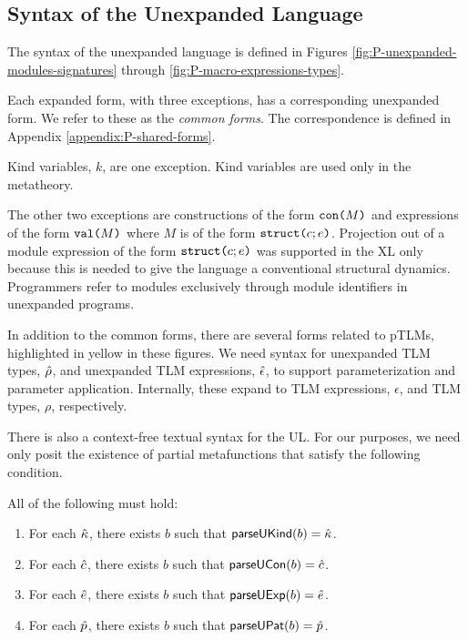 \subsection{Syntax of the Unexpanded Language}
The syntax of the unexpanded language is defined in Figures \ref{fig:P-unexpanded-modules-signatures} through \ref{fig:P-macro-expressions-types}.

Each expanded form, with three exceptions, has a corresponding unexpanded form. We refer to these as the \emph{common forms}. The correspondence is defined in Appendix \ref{appendix:P-shared-forms}.

Kind variables, $k$, are one exception. Kind variables are used only in the metatheory.

The other two exceptions are constructions of the form $\texttt{con}\texttt{(}M\texttt{)}$ and expressions of the form $\texttt{val}\texttt{(}M\texttt{)}$ where $M$ is of the form $\texttt{struct}\texttt{(}c; e\texttt{)}$. Projection out of a module expression of the form $\texttt{struct}\texttt{(}c; e\texttt{)}$ was supported in the XL only because this is needed to give the language  a conventional structural dynamics. Programmers refer to modules exclusively through module identifiers in unexpanded programs. 

In addition to the common forms, there are several forms related to pTLMs, highlighted in yellow in these figures. We need syntax for unexpanded TLM types, ${\hat\rho}$, and unexpanded TLM expressions, ${\hat\epsilon}$, to support parameterization and parameter application. Internally, these expand to TLM expressions, $\epsilon$, and TLM types, $\rho$, respectively.

There is also a context-free textual syntax for the UL. For our purposes, we need only posit the existence of partial metafunctions that satisfy the following condition. 
\begingroup
\def\thetheorem{\ref{condition:textual-representability-P}}
\begin{condition} All of the following must hold:
\begin{enumerate}
\item For each ${\hat\kappa}$, there exists $b$ such that $\mathsf{parseUKind}(b)={\hat\kappa}$.
\item For each ${\hat c}$, there exists $b$ such that $\mathsf{parseUCon}(b)={\hat c}$.
\item For each ${\hat e}$, there exists $b$ such that $\mathsf{parseUExp}(b)={\hat e}$.
\item For each $\hat{p}$, there exists $b$ such that $\mathsf{parseUPat}(b)=\hat{p}$.
\end{enumerate}
\end{condition}
\endgroup


